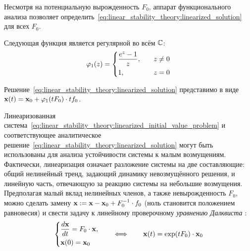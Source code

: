 Несмотря на потенциальную вырожденность $ F_0 $,
аппарат функционального анализа позволяет определить~\eqref{eq:linear_stability_theory:linearized_solution}
для всех $ F_0 $.


\begin{remark}
    \label{remark:linear_stability_theory:phi_1_function}
    Следующая функция является регулярной во всём $ \mathbb{C} $:
    \begin{equation}
        \label{eq:linear_stability_theory:phi_1_function}
        \varphi_1(z) =
        \begin{dcases}
            \frac{e^z - 1}{z}, &\quad z \neq 0 \\
            1, &\quad z = 0
        \end{dcases}
    \end{equation}
\end{remark}

\begin{remark}
    \label{remark:linear_stability_theory:linearized_solution_via_phi_1}
    Решение~\eqref{eq:linear_stability_theory:linearized_solution} представимо в виде
    $ \mathbf{x}(t) = \mathbf{x}_0 + \varphi_1(t F_0) \cdot t f_0 $.
\end{remark}

Линеаризованная система~\eqref{eq:linear_stability_theory:linearized_initial_value_problem}
и соответствующее аналитическое решение~\eqref{eq:linear_stability_theory:linearized_solution}
могут быть использованы для анализа устойчивости системы к малым возмущениям.
Фактически, линеаризация означает разложение системы на две составляющие:
общий нелинейный тренд, задающий динамику невозмущённого решения,
и линейную часть, отвечающую за реакцию системы на небольшие возмущения.
Предполагая малый вклад нелинейных членов, а также невырожденность $ F_0 $,
можно сделать замену $ \mathbf{x}: = \mathbf{x} - \mathbf{x}_0 + F_0^{-1} \cdot f_0 $
(ноль становится положением равновесия)
и свести задачу к линейному проверочному \emph{уравнению Далквиста} \cite{dahlquist1963special}:
%
\begin{equation}
    \label{eq:linear_stability_theory:Dahlquist_equation}
    \begin{dcases}
        \dfrac{d \mathbf{x}}{d t} = F_0 \cdot \mathbf{x}, \\
        \mathbf{x}(0) = \mathbf{x}_0
    \end{dcases}
    \qquad
    \Longleftrightarrow
    \qquad
    \mathbf{x}(t) = \exp(t F_0) \cdot \mathbf{x}_0
\end{equation}


